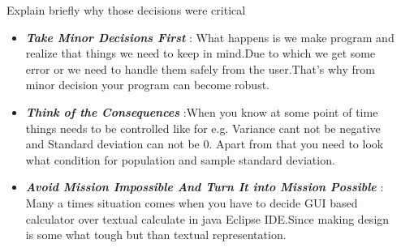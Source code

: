 \documentclass[final]{beamer}
\newlength{\onecolwid}
\newlength{\twocolwid}
\begin{document}
\begin{frame}[t]
\begin{columns}[t]
\begin{column}{\twocolwid}
\begin{columns}[t,totalwidth=\twocolwid]
\begin{column}{\onecolwid}

\begin{block}{ Explain briefly why those decisions were critical}

\begin{itemize}
\item  \textit{\textbf{Take Minor Decisions First}} : What happens is we make program and realize  that things we need to keep in mind.Due to which we get some error or we need to handle them safely from the user.That's why from minor decision your program can become robust. \newline
\item  \textit{\textbf{Think of the Consequences}} :When you know at some point of time things needs to be controlled like for e.g. Variance cant not be negative and Standard deviation can not be 0. Apart from that you need to look what condition for population and sample standard deviation. \newline
\item \textit{\textbf{Avoid Mission Impossible And Turn It into Mission Possible }} : Many a times situation comes when you have to decide GUI based calculator over textual calculate in java Eclipse IDE.Since making design is some what tough but than textual representation.
\end{itemize}


\end{block}


\end{column} %

\begin{column}{\onecolwid}\vspace{-.6in} %



\end{column}
\end{columns}
\end{column}
\end{columns}
\end{frame}
\end{document}

